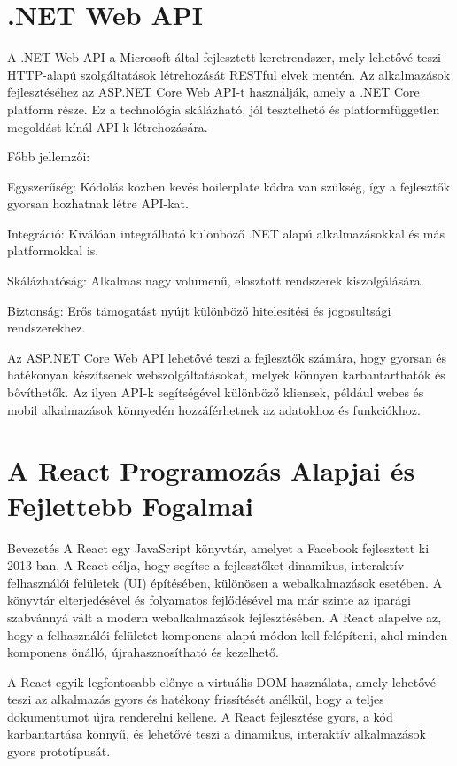 \documentclass[colorlinks]{thesis-kando}
\theoremstyle{definition}
\theoremstyle{remark}
\begin{document}
\section{.NET Web API}

A .NET Web API a Microsoft által fejlesztett keretrendszer, mely lehetővé teszi HTTP-alapú szolgáltatások létrehozását RESTful elvek mentén. Az alkalmazások fejlesztéséhez az ASP.NET Core Web API-t használják, amely a .NET Core platform része. Ez a technológia skálázható, jól tesztelhető és platformfüggetlen megoldást kínál API-k létrehozására.

Főbb jellemzői:

Egyszerűség: Kódolás közben kevés boilerplate kódra van szükség, így a fejlesztők gyorsan hozhatnak létre API-kat.

Integráció: Kiválóan integrálható különböző .NET alapú alkalmazásokkal és más platformokkal is.

Skálázhatóság: Alkalmas nagy volumenű, elosztott rendszerek kiszolgálására.

Biztonság: Erős támogatást nyújt különböző hitelesítési és jogosultsági rendszerekhez.

Az ASP.NET Core Web API lehetővé teszi a fejlesztők számára, hogy gyorsan és hatékonyan készítsenek webszolgáltatásokat, melyek könnyen karbantarthatók és bővíthetők. Az ilyen API-k segítségével különböző kliensek, például webes és mobil alkalmazások könnyedén hozzáférhetnek az adatokhoz és funkciókhoz.

\section{A React Programozás Alapjai és Fejlettebb Fogalmai}

Bevezetés
A React egy JavaScript könyvtár, amelyet a Facebook fejlesztett ki 2013-ban. A React célja, hogy segítse a fejlesztőket dinamikus, interaktív felhasználói felületek (UI) építésében, különösen a webalkalmazások esetében. A könyvtár elterjedésével és folyamatos fejlődésével ma már szinte az iparági szabvánnyá vált a modern webalkalmazások fejlesztésében. A React alapelve az, hogy a felhasználói felületet komponens-alapú módon kell felépíteni, ahol minden komponens önálló, újrahasznosítható és kezelhető.

A React egyik legfontosabb előnye a virtuális DOM használata, amely lehetővé teszi az alkalmazás gyors és hatékony frissítését anélkül, hogy a teljes dokumentumot újra renderelni kellene. A React fejlesztése gyors, a kód karbantartása könnyű, és lehetővé teszi a dinamikus, interaktív alkalmazások gyors prototípusát.
\end{document}
